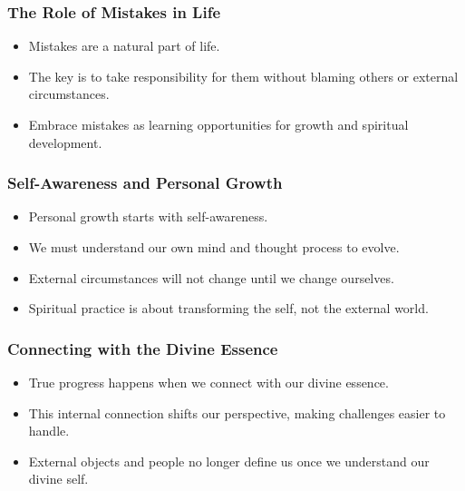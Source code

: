 \begin{frame}[fragile]\frametitle{The Role of Mistakes in Life}
\begin{itemize}
    \item Mistakes are a natural part of life.
    \item The key is to take responsibility for them without blaming others or external circumstances.
    \item Embrace mistakes as learning opportunities for growth and spiritual development.
\end{itemize}
\end{frame}

\begin{frame}[fragile]\frametitle{Self-Awareness and Personal Growth}
\begin{itemize}
    \item Personal growth starts with self-awareness.
    \item We must understand our own mind and thought process to evolve.
    \item External circumstances will not change until we change ourselves.
    \item Spiritual practice is about transforming the self, not the external world.
\end{itemize}
\end{frame}

\begin{frame}[fragile]\frametitle{Connecting with the Divine Essence}
\begin{itemize}
    \item True progress happens when we connect with our divine essence.
    \item This internal connection shifts our perspective, making challenges easier to handle.
    \item External objects and people no longer define us once we understand our divine self.
\end{itemize}
\end{frame}

